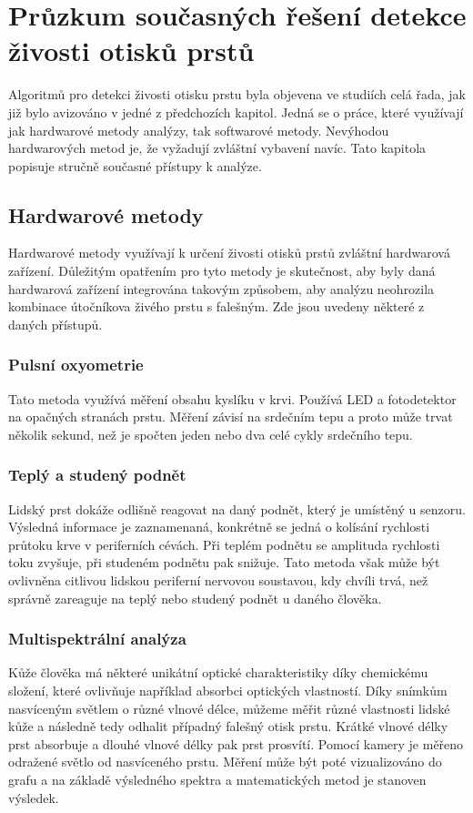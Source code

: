 \chapter{Průzkum současných řešení detekce živosti otisků prstů}
\label{chap:Pruzkum}
Algoritmů pro detekci živosti otisku prstu byla objevena ve studiích celá řada, jak již bylo avizováno v jedné z předchozích kapitol. Jedná se o práce, které využívají jak hardwarové metody analýzy, tak softwarové metody. Nevýhodou hardwarových metod je, že vyžadují zvláštní vybavení navíc. Tato kapitola popisuje stručně současné přístupy k analýze.

\section{Hardwarové metody}
Hardwarové metody využívají k určení živosti otisků prstů zvláštní hardwarová zařízení. Důležitým opatřením pro tyto metody je skutečnost, aby byly daná hardwarová zařízení integrována takovým způsobem, aby analýzu neohrozila kombinace útočníkova živého prstu s falešným. Zde jsou uvedeny některé z daných přístupů.
\subsection*{Pulsní oxyometrie}
Tato metoda využívá měření obsahu kyslíku v krvi. Používá LED a fotodetektor na opačných stranách prstu. Měření závisí na srdečním tepu a proto může trvat několik sekund, než je spočten jeden nebo dva celé cykly srdečního tepu. \cite{BiometricsEncyclopedia2009}
\subsection*{Teplý a studený podnět}
Lidský prst dokáže odlišně reagovat na daný podnět, který je umístěný u senzoru. Výsledná informace je zaznamenaná, konkrétně se jedná o kolísání rychlosti průtoku krve v periferních cévách. Při teplém podnětu se amplituda rychlosti toku zvyšuje, při studeném podnětu pak snižuje. Tato metoda však může být ovlivněna citlivou lidskou periferní nervovou soustavou, kdy chvíli trvá, než správně zareaguje na teplý nebo studený podnět u daného člověka. \cite{AdvancedBiometricsTechnologies2011}
\subsection*{Multispektrální analýza}
Kůže člověka má některé unikátní optické charakteristiky díky chemickému složení, které ovlivňuje například absorbci optických vlastností. Díky snímkům nasvíceným světlem o různé vlnové délce, můžeme měřit různé vlastnosti lidské kůže a následně tedy odhalit případný falešný otisk prstu. Krátké vlnové délky prst absorbuje a dlouhé vlnové délky pak prst prosvítí. Pomocí kamery je měřeno odražené světlo od nasvíceného prstu. Měření může být poté vizualizováno do grafu a na základě výsledného spektra a matematických metod je stanoven výsledek. \cite{AdvancedBiometricsTechnologies2011}

